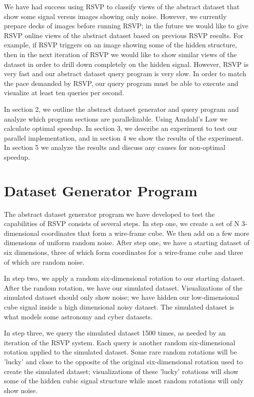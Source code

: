 \documentclass[12pt, letterpaper]{article}
\begin{document}
We have had success using RSVP to classify views of the abstract dataset that show some signal versus 
images showing only noise.  However, we 
currently prepare decks of images before running RSVP; in the future we would like to give RSVP online views of 
the abstract 
dataset based on previous RSVP results.  For example, if RSVP triggers on an image showing some of the hidden 
structure, then in the next iteration of RSVP we would like to show similar views of the dataset in order to drill down
completely on the hidden signal.  However, RSVP is very fast and our abstract dataset query program is very slow.  
In order to match the pace demanded by RSVP, our query program must be able to execute and visualize at least ten
queries per second.  

In section 2, we outline the abstract dataset generator and query program and analyze which program sections are 
parallelizable.  Using Amdahl's Law\cite{Amdahl} we calculate optimal speedup.  In section 3, we describe an 
experiment to test our parallel implementation, and in section 4 we show the results of the experiment.  
In section 5 we analyze the results and discuss any causes for non-optimal speedup.

\section{Dataset Generator Program}

The abstract dataset generator program we have developed to test the capabilities of RSVP consists of several steps.
In step one, we create a set of N 3-dimensional coordinates that form a wire-frame cube.  We then add on a few more 
dimensions of uniform random noise.  After step one, we have a starting dataset of six dimensions, 
three of which form coordinates for a wire-frame cube and three of which are random noise. 

In step two, we apply a random six-dimensional rotation to our starting dataset.  After the random rotation, we have 
our simulated dataset.  Visualizations of the simulated dataset should only show noise; we have hidden our 
low-dimensional cube signal inside a high dimensional noisy dataset.  The simulated dataset is what models 
some astronomy and cyber datasets. 

In step three, we query the simulated dataset 1500 times, as needed by an iteration of the RSVP system.  
Each query is another random six-dimensional rotation applied
to the simulated dataset.  Some rare random rotations will be 'lucky' and close to the opposite of the original 
six-dimensional rotation used to create the simulated dataset; visualizations of these 'lucky' rotations
will show some of the hidden cubic signal structure while most random rotations will only show noise.
\end{document}

